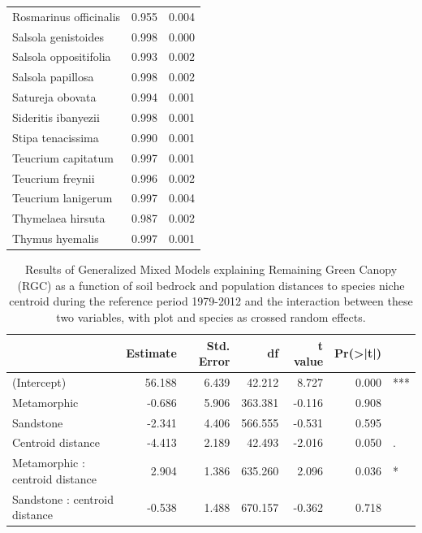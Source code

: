 \documentclass[11pt,twoside]{reedthesis}
\begin{document}
\begin{table}[H]
\begin{tabular}[t]{lrr}
Rosmarinus officinalis & 0.955 & 0.004\\
Salsola genistoides & 0.998 & 0.000\\
Salsola oppositifolia & 0.993 & 0.002\\
Salsola papillosa & 0.998 & 0.002\\
Satureja obovata & 0.994 & 0.001\\
Sideritis ibanyezii & 0.998 & 0.001\\
Stipa tenacissima & 0.990 & 0.001\\
Teucrium capitatum & 0.997 & 0.001\\
Teucrium freynii & 0.996 & 0.002\\
Teucrium lanigerum & 0.997 & 0.004\\
Thymelaea hirsuta & 0.987 & 0.002\\
Thymus hyemalis & 0.997 & 0.001\\
\bottomrule
\end{tabular}
\end{table}
\begin{table}[H]

\caption[Results of Generalized Mixed Models explaining Remaining Green Canopy (RGC) as a function of distances to niche centroid.]{\label{tab:unnamed-chunk-27}Results of Generalized Mixed Models explaining Remaining Green Canopy (RGC) as a function of soil bedrock and population distances to species niche centroid during the reference period 1979-2012 and the interaction between these two variables, with plot and species as crossed random effects.}
\centering
\fontsize{7}{9}\selectfont
\begin{tabular}[t]{lrrrrrl}
\toprule
 & Estimate & Std. Error & df & t value & Pr(>|t|) & \\
\midrule
(Intercept) & 56.188 & 6.439 & 42.212 & 8.727 & 0.000 & ***\\
Metamorphic & -0.686 & 5.906 & 363.381 & -0.116 & 0.908 & \\
Sandstone & -2.341 & 4.406 & 566.555 & -0.531 & 0.595 & \\
Centroid distance & -4.413 & 2.189 & 42.493 & -2.016 & 0.050 & .\\
Metamorphic : centroid distance & 2.904 & 1.386 & 635.260 & 2.096 & 0.036 & *\\
Sandstone : centroid distance & -0.538 & 1.488 & 670.157 & -0.362 & 0.718 & \\
\bottomrule
\end{tabular}
\end{table}
\end{document}

